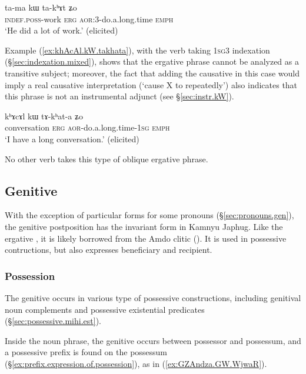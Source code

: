   \begin{exe}
\ex \label{ex:tama.kW.takhAt}
\gll ta-ma kɯ ta-kʰɤt ʑo  \\
\textsc{indef}.\textsc{poss}-work \textsc{erg} \textsc{aor}:3\flobv{}-do.a.long.time \textsc{emph} \\
\glt `He did a lot of work.' (elicited)
\end{exe}

Example (\ref{ex:khAcAl.kW.takhata}), with the verb   taking \textsc{1sg}\fl{}3 indexation (§\ref{sec:indexation.mixed}), shows that the ergative phrase cannot be analyzed as a transitive subject; moreover, the fact that adding the causative in this case would imply a real causative interpretation (`cause X to repeatedly') also indicates that this phrase is not an instrumental adjunct (see §\ref{sec:instr.kW}).

  \begin{exe}
\ex \label{ex:khAcAl.kW.takhata}
\gll kʰɤcɤl kɯ tɤ-kʰat-a ʑo \\
conversation \textsc{erg} \textsc{aor}-do.a.long.time-\textsc{1sg} \textsc{emph} \\
\glt `I have a long conversation.' (elicited)
\end{exe}

No other verb takes this type of oblique ergative phrase.

\subsection{Genitive} \label{sec:genitive}
With the exception of particular forms for some pronouns (§\ref{sec:pronouns.gen}), the genitive postposition has the invariant form  in Kamnyu Japhug. Like the ergative , it is likely borrowed from the Amdo clitic  (\citealt[62]{haller04themchen}). It is used in possessive contructions, but also expresses beneficiary and recipient.

\subsubsection{Possession} \label{sec:gen.possession}
The genitive  occurs in various type of possessive constructions, including genitival noun complements and possessive existential predicates (§\ref{sec:possessive.mihi.est}).

Inside the noun phrase, the genitive occurs between possessor and possessum, and a possessive prefix is found on the possessum (§\ref{ex:prefix.expression.of.possession}), as in (\ref{ex:GZAndza.GW.WjwaR}).  

